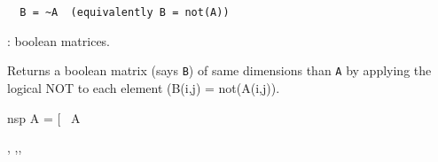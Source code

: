 \begin{mandesc}
\end{mandesc}

\begin{calling_sequence}
\begin{verbatim}
  B = ~A  (equivalently B = not(A))
\end{verbatim}
\end{calling_sequence}
\begin{parameters}
  \begin{varlist}
    : boolean matrices. 
  \end{varlist}
\end{parameters}

\begin{mandescription}
  Returns a boolean matrix (says \verb+B+) of same dimensions than \verb+A+ by applying
  the logical NOT to each element (B(i,j) = not(A(i,j)).
\end{mandescription}

\begin{examples}
\begin{mintednsp}{nsp}
A = [%
~A
\end{mintednsp}

\end{examples}

\begin{manseealso}
  , ,,   
\end{manseealso}

